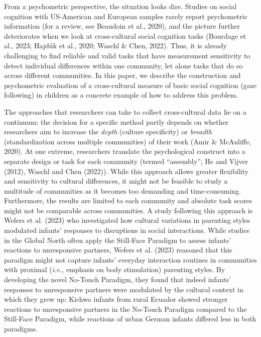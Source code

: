 \documentclass[
  man,floatsintext]{apa7}
\begin{document}
From a psychometric perspective, the situation looks dire. Studies on social cognition with US-American and European samples rarely report psychometric information (for a review, see Beaudoin et al., 2020), and the picture further deteriorates when we look at cross-cultural social cognition tasks (Bourdage et al., 2023; Hajdúk et al., 2020; Waschl \& Chen, 2022).
Thus, it is already challenging to find reliable and valid tasks that have measurement sensitivity to detect individual differences within one community, let alone tasks that do so across different communities.
In this paper, we describe the construction and psychometric evaluation of a cross-cultural measure of basic social cognition (gaze following) in children as a concrete example of how to address this problem.

The approaches that researchers can take to collect cross-cultural data lie on a continuum: the decision for a specific method partly depends on whether researchers aim to increase the \emph{depth} (culture specificity) or \emph{breadth} (standardization across multiple communities) of their work (Amir \& McAuliffe, 2020).
At one extreme, researchers translate the psychological construct into a separate design or task for each community (termed ``assembly''; He and Vijver (2012), Waschl and Chen (2022)).
While this approach allows greater flexibility and sensitivity to cultural differences, it might not be feasible to study a multitude of communities as it becomes too demanding and time-consuming.
Furthermore, the results are limited to each community and absolute task scores might not be comparable across communities.
A study following this approach is Wefers et al. (2023) who investigated how cultural variations in parenting styles modulated infants' responses to disruptions in social interactions.
While studies in the Global North often apply the Still-Face Paradigm to assess infants' reactions to unresponsive partners, Wefers et al. (2023) reasoned that this paradigm might not capture infants' everyday interaction routines in communities with proximal (\emph{i.e.,} emphasis on body stimulation) parenting styles.
By developing the novel No-Touch Paradigm, they found that indeed infants' responses to unresponsive partners were modulated by the cultural context in which they grew up: Kichwa infants from rural Ecuador showed stronger reactions to unresponsive partners in the No-Touch Paradigm compared to the Still-Face Paradigm, while reactions of urban German infants differed less in both paradigms.
\end{document}

